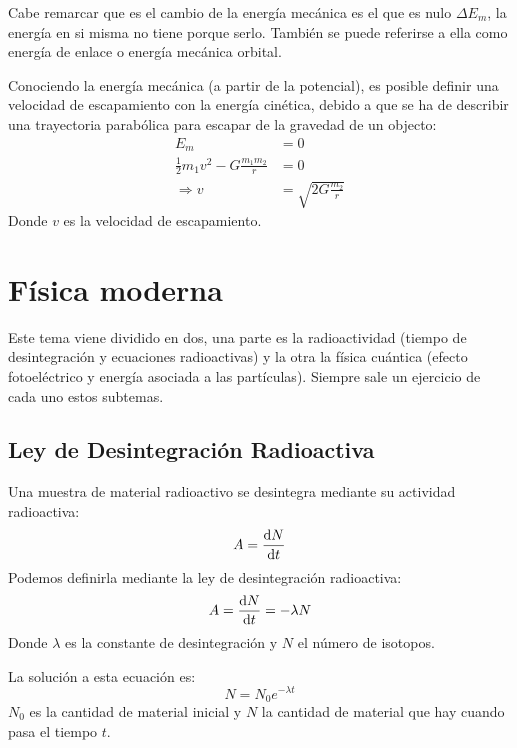 \documentclass[arial,a4paper,print]{article}
\begin{document}
Cabe remarcar que es el cambio de la energía mecánica es el que es nulo $\Delta E_{m}$, la energía en si misma no tiene porque serlo. También se puede referirse a ella como energía de enlace o energía mecánica orbital.

Conociendo la energía mecánica (a partir de la potencial), es posible definir una velocidad de escapamiento con la energía cinética, debido a que se ha de describir una trayectoria parabólica para escapar de la gravedad de un objecto:
\begin{align*}
	E_{m} &= 0 \\
	\frac12m_{1}v^2 - G\frac{m_{1}m_{2}}{r} &= 0  \\
	\Rightarrow v &= \sqrt{2G\frac{m_{2}}{r}}
\end{align*}
Donde $ v$ es la velocidad de escapamiento.
\pagebreak

\section{Física moderna}
Este tema viene dividido en dos, una parte es la radioactividad (tiempo de desintegración y ecuaciones radioactivas) y la otra la física cuántica (efecto fotoeléctrico y energía asociada a las partículas). Siempre sale un ejercicio de cada uno estos subtemas.

\subsection{Ley de Desintegración Radioactiva}
Una muestra de material radioactivo se desintegra mediante su actividad radioactiva:
\begin{equation*}
	A = \dv{N}{t}
\end{equation*}
Podemos definirla mediante la ley de desintegración radioactiva:
\begin{equation*}
	A = \dv{N}{t} = -\lambda N
\end{equation*}
Donde $\lambda$ es la constante de desintegración y $N$ el número de isotopos.

La solución a esta ecuación es:
\begin{equation*}
	N = N_{0}e^{-\lambda t}
\end{equation*}
$N_{0}$ es la cantidad de material inicial y $N$ la cantidad de material que hay cuando pasa el tiempo $t$.
\end{document}
